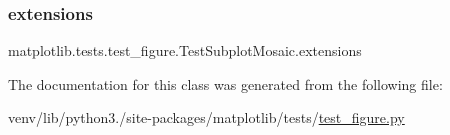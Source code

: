 \subsubsection{\texorpdfstring{extensions}{extensions}}
{\footnotesize\ttfamily matplotlib.\+tests.\+test\+\_\+figure.\+Test\+Subplot\+Mosaic.\+extensions\hspace{0.3cm}{\ttfamily [static]}}



The documentation for this class was generated from the following file\+:\begin{DoxyCompactItemize}
\item 
venv/lib/python3./site-\/packages/matplotlib/tests/\hyperlink{test__figure_8py}{test\+\_\+figure.\+py}\end{DoxyCompactItemize}
